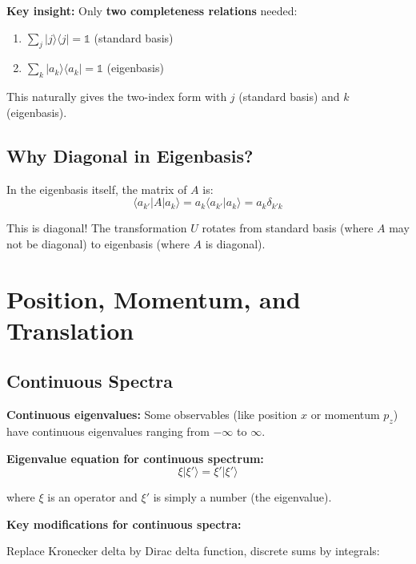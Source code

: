 \documentclass[11pt,a4paper]{article}
\begin{document}
\textbf{Key insight:} Only \textbf{two completeness relations} needed:
\begin{enumerate}
\item $\sum_j |j\rangle\langle j| = \mathbb{1}$ (standard basis)
\item $\sum_k |a_k\rangle\langle a_k| = \mathbb{1}$ (eigenbasis)
\end{enumerate}

This naturally gives the two-index form with $j$ (standard basis) and $k$ (eigenbasis).

\subsection*{Why Diagonal in Eigenbasis?}

In the eigenbasis itself, the matrix of $A$ is:
$$\langle a_{k'}|A|a_k\rangle = a_k \langle a_{k'}|a_k\rangle = a_k \delta_{k'k}$$

This is diagonal! The transformation $U$ rotates from standard basis (where $A$ may not be diagonal) to eigenbasis (where $A$ is diagonal).
\newpage
\section{Position, Momentum, and Translation}

\subsection{Continuous Spectra}

\textbf{Continuous eigenvalues:} Some observables (like position $x$ or momentum $p_z$) have continuous eigenvalues ranging from $-\infty$ to $\infty$.

\textbf{Eigenvalue equation for continuous spectrum:}
\begin{equation}
\xi|\xi'\rangle = \xi'|\xi'\rangle
\tag{1.183}
\end{equation}

where $\xi$ is an operator and $\xi'$ is simply a number (the eigenvalue).

\textbf{Key modifications for continuous spectra:}

Replace Kronecker delta by Dirac delta function, discrete sums by integrals:
\end{document}
